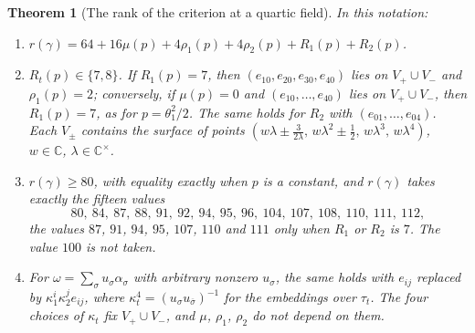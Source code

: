 \documentclass[11pt,reqno]{amsart}
\theoremstyle{plain}
\newtheorem{theorem}{Theorem}[section]
\theoremstyle{definition}
\theoremstyle{remark}
\newcommand{\CC}{\mathbb{C}}
\newcommand{\bbar}[1]{\overline{#1}}
\begin{document}
\begin{theorem}[The rank of the criterion at a quartic field]
\label{thm:quarticrank}
In this notation:
\begin{enumerate}[label=\textup{(\roman*)},leftmargin=2.6em,itemsep=2pt]
\item $r(\gamma)=64+16\mu(p)+4\rho_{1}(p)+4\rho_{2}(p)+R_{1}(p)+R_{2}(p)$.
\item $R_{t}(p)\in\{7,8\}$. If $R_{1}(p)=7$, then
  $(e_{10},e_{20},e_{30},e_{40})$ lies on $V_{+}\cup V_{-}$ and
  $\rho_{1}(p)=2$; conversely, if $\mu(p)=0$ and
  $(e_{10},\dots,e_{40})$ lies on $V_{+}\cup V_{-}$, then $R_{1}(p)=7$, as for
  $p=\theta_{1}^{2}/2$. The same holds for $R_{2}$ with
  $(e_{01},\dots,e_{04})$. Each $V_{\pm}$ contains the surface of points
  $(w\lambda\pm\frac{3}{2\lambda},\,w\lambda^{2}\pm\frac12,\,w\lambda^{3},
  \,w\lambda^{4})$, $w\in\CC$, $\lambda\in\CC^{\times}$.
\item $r(\gamma)\ge80$, with equality exactly when $p$ is a constant, and
  $r(\gamma)$ takes exactly the fifteen values
  \[
    80,\ 84,\ 87,\ 88,\ 91,\ 92,\ 94,\ 95,\ 96,\ 104,\ 107,\ 108,\ 110,\ 111,\
    112 ,
  \]
  the values $87$, $91$, $94$, $95$, $107$, $110$ and $111$ only when $R_{1}$
  or $R_{2}$ is $7$. The value $100$ is not taken.
\item For $\omega=\sum_{\sigma}u_{\sigma}\alpha_{\sigma}$ with arbitrary
  nonzero $u_{\sigma}$, the same holds with $e_{ij}$ replaced by
  $\kappa_{1}^{i}\kappa_{2}^{j}e_{ij}$, where $\kappa_{t}^{4}=
  (u_{\sigma}u_{\bbar\sigma})^{-1}$ for the embeddings over $\tau_{t}$. The
  four choices of $\kappa_{t}$ fix $V_{+}\cup V_{-}$, and $\mu$, $\rho_{1}$,
  $\rho_{2}$ do not depend on them.
\end{enumerate}
\end{theorem}
\end{document}
